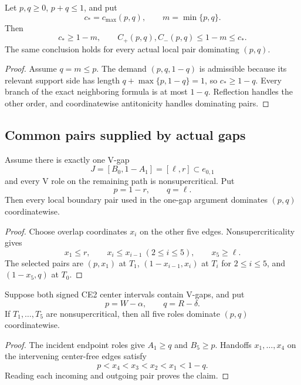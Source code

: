 \begin{lemma}
\label{lem:new-common-pair-domination}
Let $p,q\ge0$, $p+q\le1$, and put
\[
 c_*=c_{\max}(p,q),\qquad m=\min\{p,q\}.
\]
Then
\[
 c_*\ge1-m,
 \qquad
 C_+(p,q),C_-(p,q)\le1-m\le c_*.
 \tag{6.26}
\]
The same conclusion holds for every actual local pair dominating $(p,q)$.
\end{lemma}

\begin{proof}
Assume $q=m\le p$.  The demand $(p,q,1-q)$ is admissible because its
relevant support side has length
$q+\max\{p,1-q\}=1$, so $c_*\ge1-q$.  Every branch of the exact neighboring
formula is at most $1-q$.  Reflection handles the other order, and
coordinatewise antitonicity handles dominating pairs.
\end{proof}

\subsection{Common pairs supplied by actual gaps}

\begin{lemma}
\label{lem:readable-one-gap-common-pair}
Assume there is exactly one V-gap
\[
 J=[B_0,1-A_1]=[\ell,r]\subset e_{0,1}
\]
and every V role on the remaining path is nonsupercritical.  Put
\[
 p=1-r,\qquad q=\ell.
\]
Then every local boundary pair used in the one-gap argument dominates
$(p,q)$ coordinatewise.
\end{lemma}

\begin{proof}
Choose overlap coordinates $x_i$ on the other five edges.
Nonsupercriticality gives
\[
 x_1\le r,\qquad
 x_i\le x_{i-1}\ (2\le i\le5),\qquad
 x_5\ge\ell.
\]
The selected pairs are $(p,x_1)$ at $T_1$,
$(1-x_{i-1},x_i)$ at $T_i$ for $2\le i\le5$, and $(1-x_5,q)$ at
$T_0$.
\end{proof}

\begin{lemma}
\label{lem:readable-two-gap-common-pair}
Suppose both signed CE2 center intervals contain V-gaps, and put
\[
 p=W-\alpha,\qquad q=R-\delta.
\]
If $T_1,\ldots,T_5$ are nonsupercritical, then all five roles dominate
$(p,q)$ coordinatewise.
\end{lemma}

\begin{proof}
The incident endpoint roles give $A_1\ge q$ and $B_5\ge p$.  Handoffs
$x_1,\ldots,x_4$ on the intervening center-free edges satisfy
\[
 p<x_4<x_3<x_2<x_1<1-q.
\]
Reading each incoming and outgoing pair proves the claim.
\end{proof}
